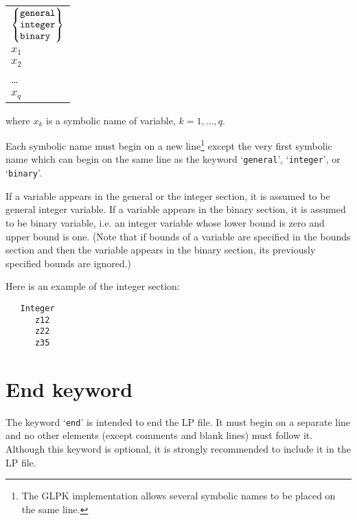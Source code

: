 \begin{center}
\begin{tabular}{l}
$
\left\{
\begin{array}{@{}l@{}}
\verb|general| \\
\verb|integer| \\
\verb|binary | \\
\end{array}
\right\}
$ \\
\hspace{10pt}$x_1$ \\
\hspace{10pt}$x_2$ \\
\hspace{10pt}\dots \\
\hspace{10pt}$x_q$ \\
\end{tabular}
\end{center}

\noindent
where $x_k$ is a symbolic name of variable, $k=1,\dots,q$.

Each symbolic name must begin on a new line\footnote{The GLPK
implementation allows several symbolic names to be placed on the same
line.} except the very first symbolic name which can begin on the same
line as the keyword `\verb|general|', `\verb|integer|', or
`\verb|binary|'.

If a variable appears in the general or the integer section, it is
assumed to be general integer variable. If a variable appears in the
binary section, it is assumed to be binary variable, i.e. an integer
variable whose lower bound is zero and upper bound is one. (Note that
if bounds of a variable are specified in the bounds section and then
the variable appears in the binary section, its previously specified
bounds are ignored.)

Here is an example of the integer section:

\begin{verbatim}
   Integer
      z12
      z22
      z35
\end{verbatim}

\section{End keyword}

The keyword `\verb|end|' is intended to end the LP file. It must begin
on a separate line and no other elements (except comments and blank
lines) must follow it. Although this keyword is optional, it is strongly
recommended to include it in the LP file.

